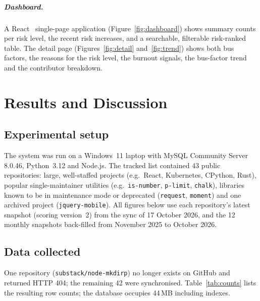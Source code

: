 \documentclass[11pt,a4paper]{report}
\begin{document}
\paragraph{Dashboard.} A React~\cite{react} single-page application
(Figure~\ref{fig:dashboard}) shows summary counts per risk level, the recent
risk increases, and a searchable, filterable risk-ranked table. The detail page
(Figures~\ref{fig:detail} and~\ref{fig:trend}) shows both bus factors, the
reasons for the risk level, the burnout signals, the bus-factor trend and the
contributor breakdown.

\chapter{Results and Discussion}
\label{ch:results}

\section{Experimental setup}

The system was run on a Windows~11 laptop with MySQL Community Server 8.0.46,
Python~3.12 and Node.js. The tracked list contained 43 public repositories:
large, well-staffed projects (e.g.\ React, Kubernetes, CPython, Rust),
popular single-maintainer utilities (e.g.\ \texttt{is-number}, \texttt{p-limit},
\texttt{chalk}), libraries known to be in maintenance mode or deprecated
(\texttt{request}, \texttt{moment}) and one archived project
(\texttt{jquery-mobile}). All figures below use each repository's latest
snapshot (scoring version~2) from the sync of 17 October 2026, and the 12
monthly snapshots back-filled from November 2025 to October 2026.

\section{Data collected}

One repository (\texttt{substack/node-mkdirp}) no longer exists on GitHub and
returned HTTP 404; the remaining 42 were synchronised. Table~\ref{tab:counts}
lists the resulting row counts; the database occupies 44\,MB including
indexes.
\end{document}
